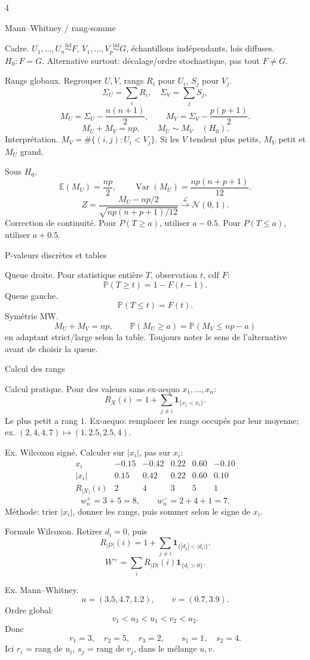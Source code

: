 \documentclass[10pt]{article}
\newcommand{\ind}{\mathbf 1}
\newcommand{\E}{\mathbb E}
\newcommand{\V}{\operatorname{Var}}
\newcommand{\Prob}{\mathbb P}
\newcommand{\iid}{\stackrel{\mathrm{iid}}{\sim}}
\newcommand{\dto}{\xrightarrow{\mathcal L}}
\newcommand{\boxhead}[1]{%
  \vspace{2pt}\par\noindent #1\par\vspace{1pt}}
\newcommand{\tinytitle}[1]{#1.}
\begin{document}
\begin{multicols*}{4}
\boxhead{Mann--Whitney / rang-somme}
\tinytitle{Cadre} \(U_1,\ldots,U_n\iid F\), \(V_1,\ldots,V_p\iid G\), échantillons indépendants, lois diffuses. \(H_0:F=G\). Alternative surtout: décalage/ordre stochastique, pas tout \(F\ne G\).

\tinytitle{Rangs globaux} Regrouper \(U,V\), rangs \(R_i\) pour \(U_i\), \(S_j\) pour \(V_j\).
\[
\Sigma_U=\sum_iR_i,\quad \Sigma_V=\sum_jS_j,
\]
\[
M_U=\Sigma_U-\frac{n(n+1)}2,\qquad
M_V=\Sigma_V-\frac{p(p+1)}2.
\]
\[
M_U+M_V=np,\qquad M_U\sim M_V\quad(H_0).
\]
\tinytitle{Interprétation} \(M_V=\#\{(i,j):U_i<V_j\}\). Si les \(V\) tendent plus petits, \(M_V\) petit et \(M_U\) grand.

\tinytitle{Sous \(H_0\)}
\[
\E(M_U)=\frac{np}{2},\qquad
\V(M_U)=\frac{np(n+p+1)}{12}.
\]
\[
Z=\frac{M_U-np/2}{\sqrt{np(n+p+1)/12}}\dto\mathcal N(0,1).
\]
\tinytitle{Correction de continuité} Pour \(P(T\ge a)\), utiliser \(a-0.5\). Pour \(P(T\le a)\), utiliser \(a+0.5\).

\boxhead{P-valeurs discrètes et tables}
\tinytitle{Queue droite} Pour statistique entière \(T\), observation \(t\), cdf \(F\):
\[
\Prob(T\ge t)=1-F(t-1).
\]
\tinytitle{Queue gauche}
\[
\Prob(T\le t)=F(t).
\]
\tinytitle{Symétrie MW}
\[
M_U+M_V=np,\qquad
\Prob(M_U\ge a)=\Prob(M_V\le np-a)
\]
en adaptant strict/large selon la table. Toujours noter le sens de l'alternative avant de choisir la queue.

\boxhead{Calcul des rangs}
\tinytitle{Calcul pratique}
Pour des valeurs sans ex-aequo \(x_1,\ldots,x_n\):
\[
R_X(i)=1+\sum_{j\ne i}\ind_{\{x_j<x_i\}}.
\]
Le plus petit a rang \(1\). Ex-aequo: remplacer les rangs occupés par leur moyenne; ex. \((2,4,4,7)\mapsto(1,2.5,2.5,4)\).

\tinytitle{Ex. Wilcoxon signé}
Calculer sur \(|x_i|\), pas sur \(x_i\):
\[
\begin{array}{c|ccccc}
x_i&-0.15&-0.42&0.22&0.60&-0.10\\
|x_i|&0.15&0.42&0.22&0.60&0.10\\
R_{|X|}(i)&2&4&3&5&1
\end{array}
\]
\[
w_n^+=3+5=8,\qquad w_n^-=2+4+1=7.
\]
Méthode: trier \(|x_i|\), donner les rangs, puis sommer selon le signe de \(x_i\).

\tinytitle{Formule Wilcoxon}
Retirer \(d_i=0\), puis
\[
R_{|D|}(i)=1+\sum_{j\ne i}\ind_{\{|d_j|<|d_i|\}}.
\]
\[
W^+=\sum_iR_{|D|}(i)\ind_{\{d_i>0\}}.
\]

\tinytitle{Ex. Mann--Whitney}
\[
u=(3.5,4.7,1.2),\qquad v=(0.7,3.9).
\]
Ordre global:
\[
v_1<u_3<u_1<v_2<u_2.
\]
Donc
\[
r_1=3,\quad r_2=5,\quad r_3=2,\qquad s_1=1,\quad s_2=4.
\]
Ici \(r_i\) = rang de \(u_i\), \(s_j\) = rang de \(v_j\), dans le mélange \(u,v\).


\end{multicols*}
\end{document}
